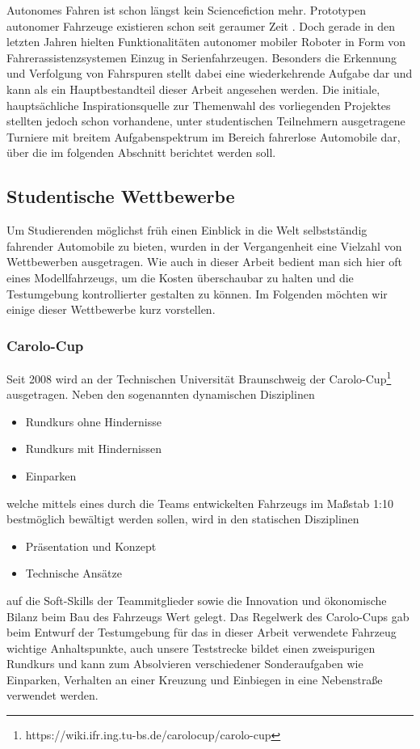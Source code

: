 Autonomes Fahren ist schon längst kein Sciencefiction mehr. Prototypen autonomer Fahrzeuge existieren schon seit geraumer Zeit \autocite{kroegerAutomatisierteFahrenIm2015}. Doch gerade in den letzten Jahren hielten Funktionalitäten autonomer mobiler Roboter in Form von Fahrerassistenzsystemen Einzug in Serienfahrzeugen. Besonders die Erkennung und Verfolgung von Fahrspuren stellt dabei eine wiederkehrende Aufgabe dar \autocite{kunzeReadingLanesRoad, naroteReviewRecentAdvances2018} und kann als ein Hauptbestandteil dieser Arbeit angesehen werden. Die initiale, hauptsächliche Inspirationsquelle zur Themenwahl des vorliegenden Projektes stellten jedoch schon vorhandene, unter studentischen Teilnehmern ausgetragene Turniere mit breitem Aufgabenspektrum im Bereich fahrerlose Automobile dar, über die im folgenden Abschnitt berichtet werden soll.

\subsection{Studentische Wettbewerbe}
Um Studierenden möglichst früh einen Einblick in die Welt selbstständig fahrender Automobile zu bieten, wurden in der Vergangenheit eine Vielzahl von Wettbewerben ausgetragen. Wie auch in dieser Arbeit bedient man sich hier oft eines Modellfahrzeugs, um die Kosten überschaubar zu halten und die Testumgebung kontrollierter gestalten zu können. Im Folgenden möchten wir einige dieser Wettbewerbe kurz vorstellen.
\subsubsection{Carolo-Cup}
Seit 2008 wird an der Technischen Universität Braunschweig der Carolo-Cup\footnote{https://wiki.ifr.ing.tu-bs.de/carolocup/carolo-cup} ausgetragen. Neben den sogenannten dynamischen Disziplinen
\begin{itemize}
\item Rundkurs ohne Hindernisse
\item Rundkurs mit Hindernissen
\item Einparken
\end{itemize}
welche mittels eines durch die Teams entwickelten Fahrzeugs im Maßstab 1:10 bestmöglich bewältigt werden sollen, wird in den statischen Disziplinen
\begin{itemize}
\item Präsentation und Konzept
\item Technische Ansätze
\end{itemize}
auf die Soft-Skills der Teammitglieder sowie die Innovation und ökonomische Bilanz beim Bau des Fahrzeugs Wert gelegt. Das Regelwerk des Carolo-Cups gab beim Entwurf der Testumgebung für das in dieser Arbeit verwendete Fahrzeug wichtige Anhaltspunkte, auch unsere Teststrecke bildet einen zweispurigen Rundkurs und kann zum Absolvieren verschiedener Sonderaufgaben wie Einparken, Verhalten an einer Kreuzung und Einbiegen in eine Nebenstraße verwendet werden.

